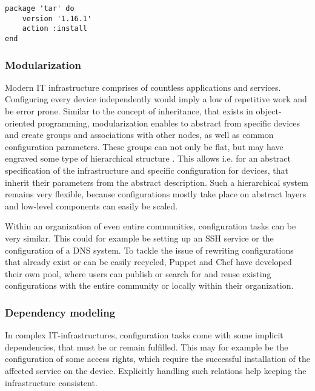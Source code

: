 \begin{verbatim}
package 'tar' do
	version '1.16.1'
	action :install
end
\end{verbatim}

\subsubsection{Modularization}

Modern IT infrastructure comprises of countless applications and services. Configuring every device independently would imply a low of repetitive work and be error prone. Similar to the concept of inheritance, that exists in object-oriented programming, modularization enables to abstract from specific devices and create groups and associations with other nodes, as well as common configuration parameters. These groups can not only be flat, but may have engraved some type of hierarchical structure \cite{delaet2010survey}. This allows i.e. for an abstract specification of the infrastructure and specific configuration for devices, that inherit their parameters from the abstract description. Such a hierarchical system remains very flexible, because configurations mostly take place on abstract layers and low-level components can easily be scaled.

Within an organization of even entire communities, configuration tasks can be very similar. This could for example be setting up an SSH service or the configuration of a DNS system. To tackle the issue of rewriting configurations that already exist or can be easily recycled, Puppet and Chef have developed their own pool, where users can publish or search for and reuse existing configurations with the entire community or locally within their organization.


\subsubsection{Dependency modeling}

In complex IT-infrastructures, configuration tasks come with some implicit dependencies, that must be or remain fulfilled. This may for example be the configuration of some access rights, which require the successful installation of the affected service on the device. Explicitly handling such relations help keeping the infrastructure consistent.

